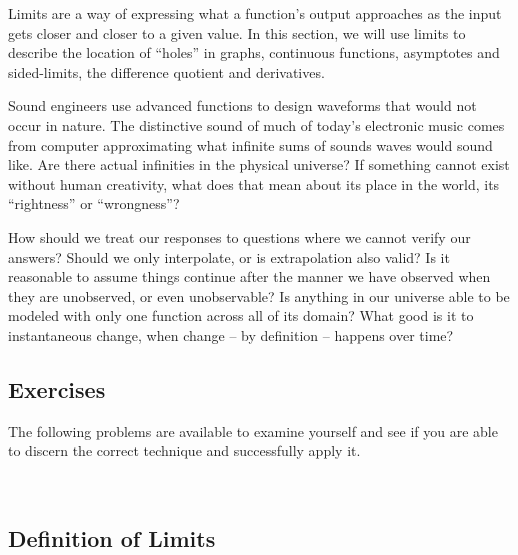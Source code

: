 


Limits are a way of expressing what a function's output approaches as the input gets
closer and closer to a given value.  In this section, we will use limits to describe the 
location of ``holes'' in graphs, continuous functions, asymptotes and sided-limits, 
the difference quotient and derivatives.

Sound engineers use advanced functions to design waveforms that would not occur in nature.
The distinctive sound of much of today's electronic music comes from computer approximating
what infinite sums of sounds waves would sound like.  Are there actual infinities in the physical
universe?  If something cannot exist without human creativity, what does that mean about its
place in the world, its ``rightness'' or ``wrongness''?


How should we treat our responses to questions where we cannot verify our answers?
Should we only interpolate, or is extrapolation also valid?  Is it reasonable to assume
things continue after the manner we have observed when they are unobserved, or even
unobservable?  Is anything in our universe able to be modeled with only one function across
all of its domain? What good is it to instantaneous change, when change -- by definition --
happens over time?



\newpage
\chapterminitoc

\newpage
{}
\newpage

\newpage
\subsection{Exercises}
The following problems are available to examine yourself
and see if you are able to discern the correct technique and successfully apply it.

~\vfill



{}
\subsection{Definition of Limits}
\noindent{}
\newpage

~\vfill
\newpage
